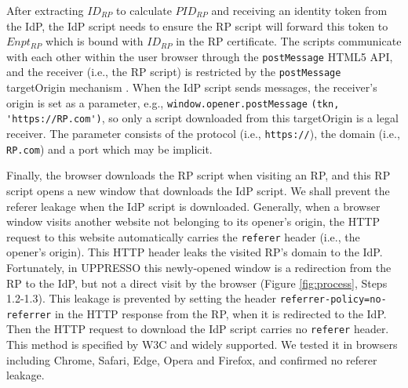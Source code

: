 After extracting $ID_{RP}$ to calculate $PID_{RP}$
    and receiving an identity token from the IdP,
    the IdP script needs to ensure the RP script will forward this token to $Enpt_{RP}$
        which is bound with $ID_{RP}$ in the RP certificate.
The scripts communicate with each other within the user browser through the \verb+postMessage+ HTML5 API,
and the receiver (i.e., the RP script)
 is restricted by the \verb+postMessage+ targetOrigin mechanism \cite{postm-targeto}.
When the IdP script sends messages,
 the receiver's origin is set as a parameter, e.g., \verb+window.opener.postMessage+ \verb+(tkn, 'https://RP.com')+,
  so only a script downloaded from this targetOrigin is a legal receiver.
The parameter consists of
    the protocol (i.e., \verb+https://+),
    the domain  (i.e., \verb+RP.com+)
    and a port which may be implicit.

Finally,
    the browser downloads the RP script when visiting an RP,
     and this RP script opens a new window that downloads the IdP script.
We shall prevent the referer leakage when the IdP script is downloaded.
Generally, when a browser window visits another website not belonging to its opener's origin,
 the HTTP request to this website automatically carries the \verb+referer+ header (i.e., the opener's origin).
This HTTP header leaks the visited RP's domain to the IdP.
Fortunately, in UPPRESSO this newly-opened window is a redirection from the RP to the IdP,
 but not a direct visit by the browser (Figure \ref{fig:process}, Steps 1.2-1.3).
This leakage is prevented by setting the header \verb+referrer-policy=no-referrer+ in the HTTP response from the RP, when it is redirected to the IdP.
Then the HTTP request to download the IdP script carries no \verb+referer+ header.
This method is specified by W3C \cite{referer_policy} and widely supported.
We tested it in browsers including Chrome, Safari, Edge, Opera and Firefox, and confirmed no referer leakage.





